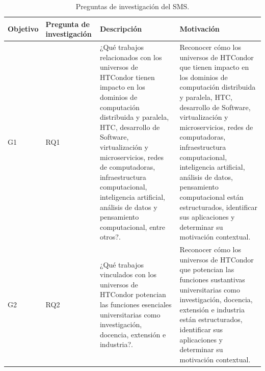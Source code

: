 \begin{table}[htbp]

	\centering
	\renewcommand{\arraystretch}{1.7}  %
	\setlength{\tabcolsep}{3pt}      %
	\vspace{10pt}                     %
	\begin{tabularx}{\textwidth}{|>{\arraybackslash}m{1cm}|>{\arraybackslash}m{1.7cm}|>{\arraybackslash}X|>{\arraybackslash}X|}
		\hline
		\textbf{Objetivo} & \textbf{Pregunta de investigación} & \textbf{Descripción}                                                                                                                                                                                                                                                                                                                     & \textbf{Motivación}                                                                                                                                                                                                                                                                                                                                                                                    \\
		\hline
		G1                & RQ1                                & ¿Qué trabajos relacionados con los universos de HTCondor tienen impacto en los dominios de computación distribuida y paralela, HTC, desarrollo de Software, virtualización y microservicios, redes de computadoras, infraestructura computacional, inteligencia artificial, análisis de datos y pensamiento computacional, entre otros?. & Reconocer cómo los universos de HTCondor que  tienen impacto en los dominios de computación distribuida y paralela, HTC, desarrollo de Software, virtualización y microservicios, redes de computadoras, infraestructura computacional, inteligencia artificial, análisis de datos, pensamiento computacional están estructurados, identificar sus aplicaciones y determinar su motivación contextual. \\
		\hline
		G2                & RQ2                                & ¿Qué trabajos vinculados con los universos de HTCondor potencian las funciones esenciales universitarias como investigación, docencia, extensión e industria?.                                                                                                                                                                           & Reconocer cómo los universos de HTCondor que potencian las funciones sustantivas universitarias como investigación, docencia, extensión e industria están estructurados, identificar sus aplicaciones y determinar su motivación contextual.                                                                                                                                                           \\
		\hline
	\end{tabularx}
	\vspace{6pt}  %
	\caption{Preguntas de investigación del SMS.}
	\label{table:RQs}

\end{table}

